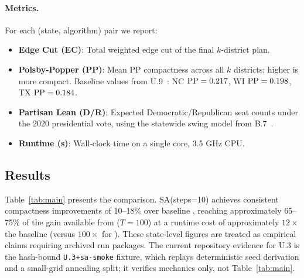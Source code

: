 \paragraph{Metrics.}
For each (state, algorithm) pair we report:
\begin{itemize}
\item \textbf{Edge Cut (EC)}: Total weighted edge cut of the final $k$-district plan.
\item \textbf{Polsby-Popper (PP)}: Mean PP compactness across all $k$ districts;
  higher is more compact.
  Baseline values from U.9~\citep{h1paper}: NC $\mathrm{PP}=0.217$, WI $\mathrm{PP}=0.198$,
  TX $\mathrm{PP}=0.184$.
\item \textbf{Partisan Lean (D/R)}: Expected Democratic/Republican seat counts
  under the 2020 presidential vote, using the statewide swing model from B.7~\citep{b7paper}.
\item \textbf{Runtime (s)}: Wall-clock time on a single core, 3.5 GHz CPU.
\end{itemize}

\subsection{Results}

Table~\ref{tab:main} presents the comparison.
SA(steps=10) achieves consistent compactness improvements of 10--18\% over
baseline \metis{}, reaching approximately 65--75\% of the gain available from
\be{}($T=100$) at a runtime cost of approximately $12\times$ the baseline
(versus $100\times$ for \be{}).
These state-level figures are treated as empirical claims requiring archived
run packages.  The current repository evidence for U.3 is the hash-bound
\texttt{U.3+sa-smoke} fixture, which replays deterministic seed derivation and
a small-grid annealing split; it verifies mechanics only, not Table~\ref{tab:main}.

